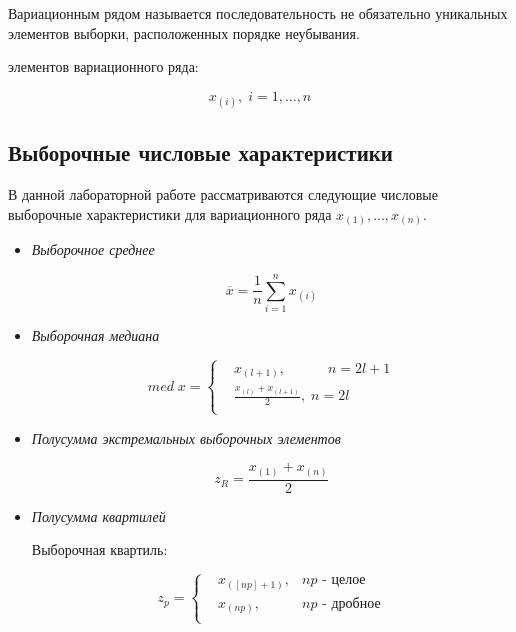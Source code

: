 \documentclass[12pt]{article}
\newcommand{\lskip}{\hfill\break}
\begin{document}
\begin{flushleft}
		Вариационным рядом называется последовательность не обязательно уникальных элементов выборки, расположенных порядке неубывания. \cite{theory}
		\lskip

		 элементов вариационного ряда:

		$$
		x_{(i)}, \; i = 1, \dots, n
		$$

	\subsection{Выборочные числовые характеристики}

		В данной лабораторной работе рассматриваются следующие числовые выборочные характеристики для вариационного ряда $x_{(1)}, \dots, x_{(n)}$. \cite{theory}

			\begin{itemize}
				\item \textit{Выборочное среднее}
				
				\begin{equation}
					\overline{x} = \frac{1}{n} \sum_{i=1}^{n}x_{(i)}
					\label{mean}
				\end{equation}
					
				\item \textit{Выборочная медиана}
				
				\begin{equation}
					med \; x = 
					\left\{
					\begin{aligned}
						& x_{(l + 1)}, \qquad \quad n = 2l + 1\\
						& \frac{x_{(l)} + x_{(l + 1)}}{2}, \; n = 2l\\
					\end{aligned}
					\right.
					\label{med}
				\end{equation}

				\item \textit{Полусумма экстремальных выборочных элементов}
				
				\begin{equation}
					z_R = \frac{x_{(1)} + x_{(n)}}{2}
					\label{extreme}
				\end{equation}

				\item \textit{Полусумма квартилей}
				
				Выборочная квартиль:

				$$
				z_p = 
				\left\{
				\begin{aligned}
					& x_{([np] + 1)}, & np\text{ - целое}\\
					& x_{(np)}, \; & np\text{ - дробное}\\
				\end{aligned}
				\right.
				$$
		

\end{itemize}
\end{flushleft}
\end{document}
